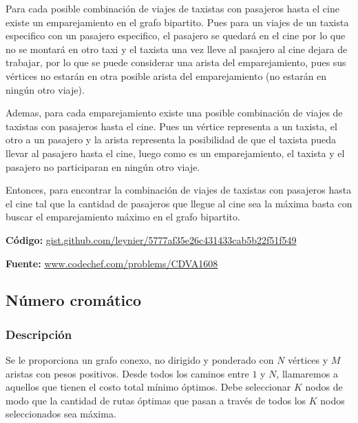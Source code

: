 \documentclass[12pt]{article}
\newcommand{\nl}{\vspace{0.3cm}}
\begin{document}
\nl

Para cada posible combinación de viajes de taxistas con pasajeros hasta el cine existe un emparejamiento en el grafo bipartito. Pues para un viajes de un taxista especifico con un pasajero especifico, el pasajero se quedará en el cine por lo que no se montará en otro taxi y el taxista una vez lleve al pasajero al cine dejara de trabajar, por lo que se puede considerar una arista del emparejamiento, pues sus vértices no estarán en otra posible arista del emparejamiento (no estarán en ningún otro viaje).

\nl

Ademas, para cada emparejamiento existe una posible combinación de viajes de taxistas con pasajeros hasta el cine. Pues un vértice representa a un taxista, el otro a un pasajero y la arista representa la posibilidad de que el taxista pueda llevar al pasajero hasta el cine, luego como es un emparejamiento, el taxista y el pasajero no participaran en ningún otro viaje.

\nl

Entonces, para encontrar la combinación de viajes de taxistas con pasajeros hasta el cine tal que la cantidad de pasajeros que llegue al cine sea la máxima basta con buscar el emparejamiento máximo en el grafo bipartito.

\nl

\textbf{Código:} \href{https://gist.github.com/leynier/5777af35e26c431433cab5b22f51f549}{gist.github.com/leynier/5777af35e26c431433cab5b22f51f549}

\nl

\textbf{Fuente:} \href{https://www.codechef.com/problems/CDVA1608}{www.codechef.com/problems/CDVA1608}

\subsection{Número cromático}

\subsubsection{Descripción}

Se le proporciona un grafo conexo, no dirigido y ponderado con $N$ vértices y $M$ aristas con pesos positivos. Desde todos los caminos entre $1$ y $N$, llamaremos a aquellos que tienen el costo total mínimo óptimos. Debe seleccionar $K$ nodos de modo que la cantidad de rutas óptimas que pasan a través de todos los $K$ nodos seleccionados sea máxima.
\end{document}
